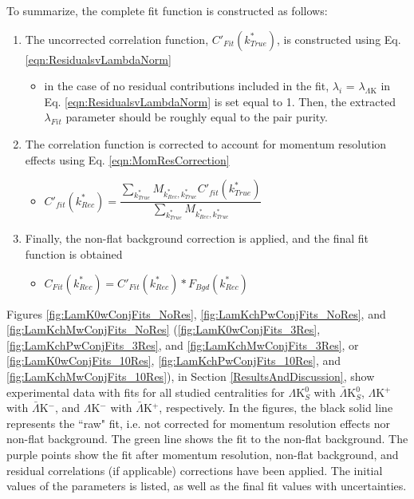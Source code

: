 \documentclass[ALICE,manyauthors]{cernphprep}
\begin{document}
To summarize, the complete fit function is constructed as follows:

\begin{enumerate}
 \item The uncorrected correlation function, $C'_{Fit}(k^{*}_{True})$, is constructed using Eq. \ref{eqn:ResidualsvLambdaNorm}
 \begin{itemize}
 \item in the case of no residual contributions included in the fit, $\lambda_{i}$ = $\lambda_{\Lambda\mathrm{K}}$ in Eq. \ref{eqn:ResidualsvLambdaNorm} is set equal to 1.  Then, the extracted $\lambda_{Fit}$ parameter should be roughly equal to the pair purity.
 \end{itemize}
 \item The correlation function is corrected to account for momentum resolution effects using Eq. \ref{eqn:MomResCorrection}
 \begin{itemize}
  \item $C'_{fit}(k^{*}_{Rec}) = \dfrac{\sum\limits_{k^{*}_{True}}M_{k^{*}_{Rec},k^{*}_{True}}C'_{fit}(k^{*}_{True})}{\sum\limits_{k^{*}_{True}}M_{k^{*}_{Rec},k^{*}_{True}}}$
 \end{itemize}
 \item Finally, the non-flat background correction is applied, and the final fit function is obtained
 \begin{itemize}
  \item $C_{Fit}(k^{*}_{Rec}) = C'_{Fit}(k^{*}_{Rec})*F_{Bgd}(k^{*}_{Rec})$
 \end{itemize}
\end{enumerate}

Figures \ref{fig:LamK0wConjFits_NoRes}, \ref{fig:LamKchPwConjFits_NoRes}, and \ref{fig:LamKchMwConjFits_NoRes} (\ref{fig:LamK0wConjFits_3Res}, \ref{fig:LamKchPwConjFits_3Res}, and \ref{fig:LamKchMwConjFits_3Res}, or \ref{fig:LamK0wConjFits_10Res}, \ref{fig:LamKchPwConjFits_10Res}, and \ref{fig:LamKchMwConjFits_10Res}), in Section \ref{ResultsAndDiscussion}, show experimental data with fits for all studied centralities for $\Lambda$K$^{0}_{S}$ with $\bar{\Lambda}$K$^{0}_{S}$, $\Lambda$K$^{+}$ with $\bar{\Lambda}$K$^{-}$, and $\Lambda$K$^{-}$ with $\bar{\Lambda}$K$^{+}$, respectively.  In the figures, the black solid line represents the ``raw" fit, i.e. not corrected for momentum resolution effects nor non-flat background.  The green line shows the fit to the non-flat background.  The purple points show the fit after momentum resolution, non-flat background, and residual correlations (if applicable) corrections have been applied.  The initial values of the parameters is listed, as well as the final fit values with uncertainties.
\end{document}
